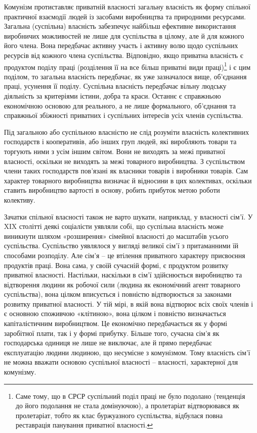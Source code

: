 \documentclass[12pt,a4paper,openany]{book}
\begin{document}
Комунізм протиставляє приватній власності загальну власність як форму спільної практичної взаємодії людей із засобами виробництва та природними ресурсами. Загальна (суспільна) власність забезпечує найбільш ефективне використання виробничих можливостей не лише для суспільства в цілому, але й для кожного його члена. Вона передбачає активну участь і активну волю щодо суспільних ресурсів від кожного члена суспільства. Відповідно, якщо приватна власність є продуктом поділу праці (розділення її на все більш приватні види праці)\footnote{Саме тому, що в СРСР суспільний поділ праці не було подолано (тенденція до його подолання не стала домінуючою), а пролетаріат відтворювався як пролетаріат, тобто як клас буржуазного суспільства, відбулася повна реставрація панування приватної власності.} і є цим поділом, то загальна власність передбачає, як уже зазначалося вище, об’єднання праці, усунення її поділу. Суспільна власність передбачає вільну людську діяльність за критеріями істини, добра та краси. Останнє є справжньою економічною основою для реального, а не лише формального, об’єднання та справжньої збіжності приватних і суспільних інтересів усіх членів суспільства.

Під загальною або суспільною власністю не слід розуміти власність колективних господарств і кооперативів, або інших груп людей, які виробляють товари та торгують ними з усім іншим світом. Вони не виходять за межі приватної власності, оскільки не виходять за межі товарного виробництва. З суспільством члени таких господарств пов’язані як власники товарів і виробники товарів. Сам характер товарного виробництва визначає й відносини в цих колективах, оскільки ставить виробництво вартості в основу, робить прибуток метою роботи колективу.

Зачатки спільної власності також не варто шукати, наприклад, у власності сім’ї. У XIX столітті деякі соціалісти уявляли собі, що суспільна власність може виникнути шляхом «розширення» сімейної власності до масштабів усього суспільства. Суспільство уявлялося у вигляді великої сім’ї з притаманними їй способами розподілу. Але сім’я – це втілення приватного характеру присвоєння продуктів праці. Вона сама, у своїй сучасній формі, є продуктом розвитку приватної власності. Настільки, наскільки в сім’ї здійснюється виробництво та відтворення людини як робочої сили (людина як економічний агент товарного суспільства), вона цілком вписується і повністю відтворюється за законами розвитку приватної власності. У тій мірі, в якій вона відтворює всіх своїх членів і є основною споживчою «клітиною», вона цілком і повністю визначається капіталістичним виробництвом. Це економічно передбачається як у формі заробітної плати, так і у формі прибутку. Більше того, сучасна сім’я як господарська одиниця не лише не виключає, але й прямо передбачає експлуатацію людини людиною, що несумісне з комунізмом. Тому власність сім’ї не можна вважати основою суспільної власності – власності, характерної для комунізму.
\end{document}
